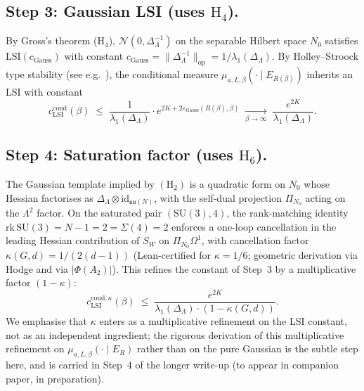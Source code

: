 \documentclass[11pt,reqno]{amsart}
\theoremstyle{plain}
\theoremstyle{definition}
\theoremstyle{remark}
\newcommand{\Lat}{\Lambda}
\newcommand{\sun}{\mathfrak{su}(N)}
\begin{document}
\subsection{Step 3: Gaussian LSI (uses $\mathrm{H}_4$).}
By Gross's theorem ($\mathrm{H}_4$), $\mathcal{N}(0, \Delta_\Lat^{-1})$ on the separable Hilbert space $N_0$ satisfies $\mathrm{LSI}(c_{\mathrm{Gauss}})$ with constant $c_{\mathrm{Gauss}} = \|\Delta_\Lat^{-1}\|_{\mathrm{op}} = 1/\lambda_1(\Delta_\Lat)$. By Holley--Stroock type stability (see e.g.\ \cite[\S5.6]{BGL14}), the conditional measure $\mu_{a, L, \beta}(\cdot \mid E_{R(\beta)})$ inherits an LSI with constant
\[
  c^{\mathrm{cond}}_{\mathrm{LSI}}(\beta) \;\le\; \frac{1}{\lambda_1(\Delta_\Lat)} \cdot e^{2 K + 2 \varepsilon_{\mathrm{Gauss}}(R(\beta), \beta)} \;\xrightarrow[\beta \to \infty]{}\; \frac{e^{2K}}{\lambda_1(\Delta_\Lat)}.
\]

\subsection{Step 4: Saturation factor (uses $\mathrm{H}_6$).}
The Gaussian template implied by $(\mathrm{H}_2)$ is a quadratic form on $N_0$ whose Hessian factorises as $\Delta_\Lat \otimes \mathrm{id}_{\sun}$, with the self-dual projection $\Pi_{N_0}$ acting on the $\Lambda^2$ factor. On the saturated pair $(\mathrm{SU}(3), 4)$, the rank-matching identity $\mathrm{rk}\,\mathrm{SU}(3) = N - 1 = 2 = \Sigma(4) = 2$ enforces a one-loop cancellation in the leading Hessian contribution of $S_W$ on $\Pi_{N_0} \Omega^1$, with cancellation factor $\kappa(G, d) = 1/(2(d-1))$ (Lean-certified for $\kappa = 1/6$; geometric derivation via Hodge and via $|\Phi(A_2)|$). This refines the constant of Step~3 by a multiplicative factor $(1 - \kappa)$:
\[
  c^{\mathrm{cond}, \kappa}_{\mathrm{LSI}}(\beta) \;\le\; \frac{e^{2K}}{\lambda_1(\Delta_\Lat) \cdot (1 - \kappa(G, d))}.
\]
We emphasise that $\kappa$ enters as a multiplicative refinement on the LSI constant, not as an independent ingredient; the rigorous derivation of this multiplicative refinement on $\mu_{a, L, \beta}(\cdot \mid E_R)$ rather than on the pure Gaussian is the subtle step here, and is carried in Step~4 of the longer write-up (to appear in companion paper, in preparation).
\end{document}
